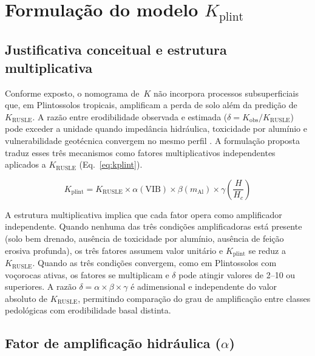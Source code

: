 \documentclass[pdflatex,sn-basic]{sn-jnl}
\begin{document}
\section{Formulação do modelo \texorpdfstring{$K_{\mathrm{plint}}$}{K-plint}}
\label{sec:model}

\subsection{Justificativa conceitual e estrutura multiplicativa}

Conforme exposto, o nomograma de~$K$ não incorpora processos subsuperficiais que, em Plintossolos tropicais, amplificam a perda de solo além da predição de $K_{\mathrm{RUSLE}}$. A razão entre erodibilidade observada e estimada ($\delta = K_{\mathrm{obs}}/K_{\mathrm{RUSLE}}$) pode exceder a unidade quando impedância hidráulica, toxicidade por alumínio e vulnerabilidade geotécnica convergem no mesmo perfil \citep{poesen_2018}. A formulação proposta traduz esses três mecanismos como fatores multiplicativos independentes aplicados a $K_{\mathrm{RUSLE}}$ (Eq.~\ref{eq:kplint}).

\begin{equation}
K_{\mathrm{plint}} = K_{\mathrm{RUSLE}} \times \alpha(\mathrm{VIB}) \times \beta(m_{\mathrm{Al}}) \times \gamma\!\left(\frac{H}{H_c}\right)
\label{eq:kplint}
\end{equation}

A estrutura multiplicativa implica que cada fator opera como amplificador independente. Quando nenhuma das três condições amplificadoras está presente (solo bem drenado, ausência de toxicidade por alumínio, ausência de feição erosiva profunda), os três fatores assumem valor unitário e $K_{\mathrm{plint}}$ se reduz a $K_{\mathrm{RUSLE}}$. Quando as três condições convergem, como em Plintossolos com voçorocas ativas, os fatores se multiplicam e $\delta$ pode atingir valores de 2--10 ou superiores. A razão $\delta = \alpha \times \beta \times \gamma$ é adimensional e independente do valor absoluto de $K_{\mathrm{RUSLE}}$, permitindo comparação do grau de amplificação entre classes pedológicas com erodibilidade basal distinta.

\subsection{Fator de amplificação hidráulica (\texorpdfstring{$\alpha$}{alfa})}
\end{document}
